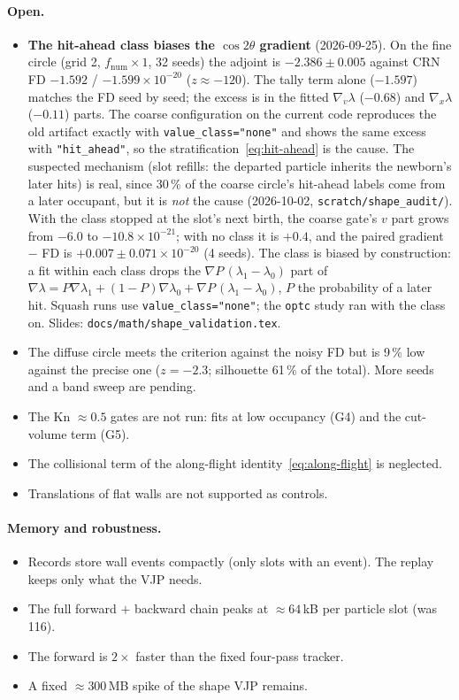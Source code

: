 \documentclass[11pt,a4paper]{article}
\numberwithin{equation}{section}
\newcommand{\code}[1]{\texttt{#1}}
\begin{document}
\paragraph{Open.}
\begin{itemize}
\item \textbf{The hit-ahead class biases the $\cos 2\theta$ gradient} (2026-09-25).  On
  the fine circle (grid 2, $f_{\mathrm{num}}\times1$, 32 seeds) the adjoint is
  $-2.386\pm0.005$ against CRN FD $-1.592$ / $-1.599\times10^{-20}$ ($z\approx-120$).  The
  tally term alone ($-1.597$) matches the FD seed by seed; the excess is in the fitted
  $\nabla_v\lambda$ ($-0.68$) and $\nabla_x\lambda$ ($-0.11$) parts.  The coarse
  configuration on the current code reproduces the old artifact exactly with
  \code{value\_class="none"} and shows the same excess with \code{"hit\_ahead"}, so the
  stratification~\eqref{eq:hit-ahead} is the cause.  The suspected mechanism (slot
  refills: the departed particle inherits the newborn's later hits) is real, since 30\,\%
  of the coarse circle's hit-ahead labels come from a later occupant, but it is
  \emph{not} the cause (2026-10-02, \code{scratch/shape\_audit/}).  With the class stopped
  at the slot's next birth, the coarse gate's $v$ part grows from $-6.0$ to
  $-10.8\times10^{-21}$; with no class it is $+0.4$, and the paired gradient $-$ FD is
  $+0.007\pm0.071\times10^{-20}$ (4 seeds).  The class is biased by construction: a fit
  within each class drops the $\nabla P\,(\lambda_1-\lambda_0)$ part of
  $\nabla\lambda = P\nabla\lambda_1 + (1-P)\nabla\lambda_0 + \nabla P\,(\lambda_1-\lambda_0)$,
  $P$ the probability of a later hit.  Squash runs use \code{value\_class="none"}; the
  \code{optc} study ran with the class on.  Slides:
  \code{docs/math/shape\_validation.tex}.
\item The diffuse circle meets the criterion against the noisy FD but is 9\,\% low
  against the precise one ($z = -2.3$; silhouette 61\,\% of the total).  More seeds
  and a band sweep are pending.
\item The Kn $\approx 0.5$ gates are not run: fits at low occupancy (G4) and the
  cut-volume term (G5).
\item The collisional term of the along-flight identity~\eqref{eq:along-flight} is
  neglected.
\item Translations of flat walls are not supported as controls.
\end{itemize}

\paragraph{Memory and robustness.}
\begin{itemize}
\item Records store wall events compactly (only slots with an event).  The replay
  keeps only what the VJP needs.
\item The full forward $+$ backward chain peaks at $\approx 64$\,kB per particle slot
  (was 116).
\item The forward is $2\times$ faster than the fixed four-pass tracker.
\item A fixed $\approx 300$\,MB spike of the shape VJP remains.
\end{itemize}
\end{document}
